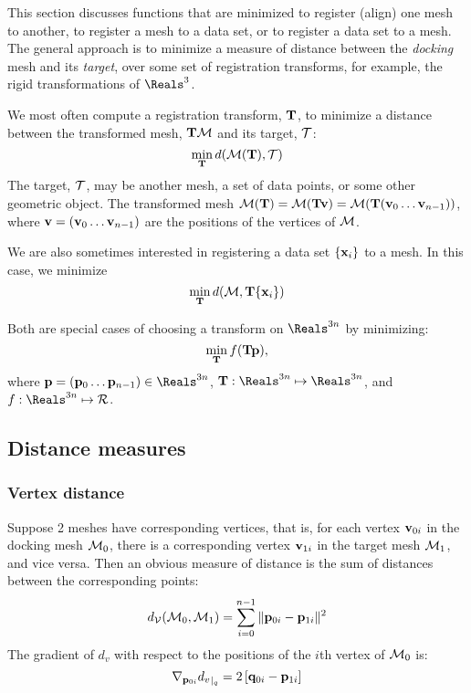 \label{sec:registration}

This section discusses functions that are minimized
to register (align) one mesh to another,
to register a mesh to a data set,
or to register a data set to a mesh.
The general approach is to minimize
a measure of distance between the {\it docking} mesh and its {\it target},
over some set of registration transforms,
for example, the rigid transformations of $\Reals^3$.

We most often compute a registration transform, ${\mathbf T}$,
to minimize a distance between the transformed mesh,
${\mathbf T}{\mathcal M}$ and its target, ${\mathcal T}$:
\begin{equation}
\min_{{\mathbf T}} d({\mathcal M}({\mathbf T}),{\mathcal T})
\end{equation}
The target, ${\mathcal T}$, may be another mesh, a set of data points,
or some other geometric object.
The transformed mesh
${\mathcal M}({\mathbf T}) = {\mathcal M}({\mathbf T}{\mathbf v}) = {\mathcal M}({\mathbf T}({\mathbf v}_0 \ldots {\mathbf v}_{n-1}))$,
where ${\mathbf v} = ({\mathbf v}_0 \ldots  {\mathbf v}_{n-1})$
are the positions of the vertices of ${\mathcal M}$.

We are also sometimes interested in registering a data set
$\{{\mathbf x}_i\}$ to a mesh.
In this case, we minimize
\begin{equation}
\min_{{\mathbf T}} d({\mathcal M},{\mathbf T}\{{\mathbf x}_i\})
\end{equation}

Both are special cases of choosing a transform on $\Reals^{3n}$
by minimizing:
\begin{equation}
\min_{{\mathbf T}} f( {\mathbf T} {\mathbf p}),
\end{equation}
where
$\p = (\p_0 \ldots  \p_{n-1}) \in \Reals^{3n}$,
$\Tr : \Reals^{3n} \mapsto \Reals^{3n}$,
and
$f : \Reals^{3n} \mapsto \Re$.

\subsection{Distance measures}
\label{sec:Distance-measures}

\subsubsection{Vertex distance}
\label{sec:Vertex-distance}

Suppose 2 meshes have corresponding vertices,
that is,
for each vertex ${\mathbf v}_{0i}$ in the docking mesh ${\mathcal M}_0$,
there is a corresponding vertex ${\mathbf v}_{1i}$ in the target mesh ${\mathcal M}_1$,
and vice versa.
Then an obvious measure of distance
is the sum of distances between the corresponding points:
\begin{equation}
d_{{\mathcal V}}({\mathcal M}_0,{\mathcal M}_1) = \sum_{i=0}^{n-1} \| {\mathbf p}_{0i} - {\mathbf p}_{1i} \|^2
\end{equation}
The gradient of $d_v$ with respect to the positions
of the $i$th vertex of ${\mathcal M}_0$ is:
\begin{equation}
{\mathbf \nabla}_{{\mathbf p}_{0i}}{{d_v}}_{\mid_{q}} = 2 \left[ {\mathbf q}_{0i} - {\mathbf p}_{1i} \right]
\end{equation}

